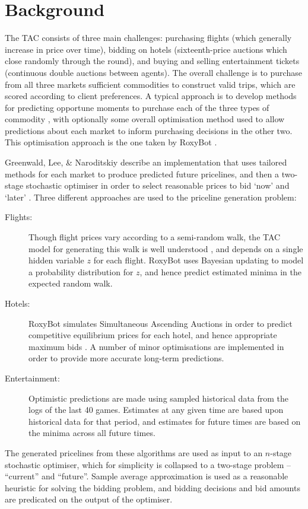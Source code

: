 \documentclass[oribibl]{llncs}
\begin{document}
\section{Background}
The TAC consists of three main challenges: purchasing flights (which generally increase in price over time), bidding on hotels (sixteenth-price auctions which close randomly through the round), and buying and selling entertainment tickets (continuous double auctions between agents). The overall challenge is to purchase from all three markets sufficient commodities to construct valid trips, which are scored according to client preferences. A typical approach is to develop methods for predicting opportune moments to purchase each of the three types of commodity \cite{stone2002attac}, with optionally some overall optimisation method used to allow predictions about each market to inform purchasing decisions in the other two. This optimisation approach is the one taken by RoxyBot \cite{lee2007roxybot}.

Greenwald, Lee, \& Naroditskiy describe an implementation that uses tailored methods for each market to produce predicted future pricelines, and then a two-stage stochastic optimiser in order to select reasonable prices to bid `now' and `later' \cite{greenwald2009roxybot}. Three different approaches are used to the priceline generation problem:
\begin{description}
\item[Flights:] Though flight prices vary according to a semi-random walk, the TAC model for generating this walk is well understood \cite{cheng2005walverine}, and depends on a single hidden variable $z$ for each flight. RoxyBot uses Bayesian updating to model a probability distribution for $z$, and hence predict estimated minima in the expected random walk.
\item[Hotels:] RoxyBot simulates Simultaneous Ascending Auctions in order to predict competitive equilibrium prices for each hotel, and hence appropriate maximum bids \cite{cramton2006simultaneous}. A number of minor optimisations are implemented in order to provide more accurate long-term predictions.
\item[Entertainment:] Optimistic predictions are made using sampled historical data from the logs of the last 40 games. Estimates at any given time are based upon historical data for that period, and estimates for future times are based on the minima across all future times.
\end{description}
The generated pricelines from these algorithms are used as input to an $n$-stage stochastic optimiser, which for simplicity is collapsed to a two-stage problem -- ``current'' and ``future''. Sample average approximation is used as a reasonable heuristic for solving the bidding problem, and bidding decisions and bid amounts are predicated on the output of the optimiser.
\end{document}

